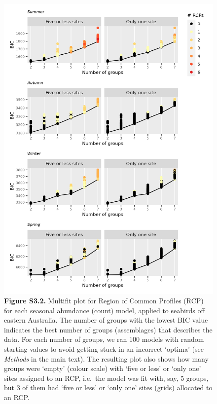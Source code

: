 \documentclass[
]{article}
\begin{document}
\begin{figure}
\centering
\includegraphics{../results/FigS3_2_multifit-NegBin.png}
\caption{\textbf{Figure S3.2.} Multifit plot for Region of Common
Profiles (RCP) for each seasonal abundance (count) model, applied to
seabirds off eastern Australia. The number of groups with the lowest BIC
value indicates the best number of groups (assemblages) that describes
the data. For each number of groups, we ran 100 models with random
starting values to avoid getting stuck in an incorrect `optima' (see
\emph{Methods} in the main text). The resulting plot also shows how many
groups were `empty' (colour scale) with `five or less' or `only one'
sites assigned to an RCP, i.e.~the model was fit with, say, 5 groups,
but 3 of them had `five or less' or `only one' sites (grids) allocated
to an RCP.}
\end{figure}

\newpage
\end{document}
